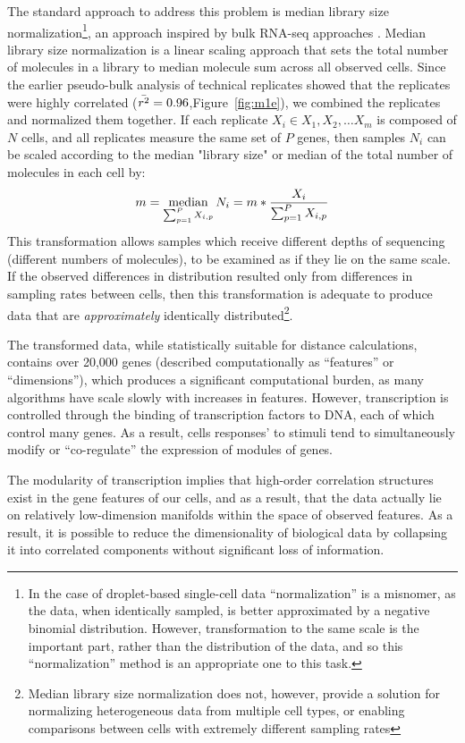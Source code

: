 The standard approach to address this problem is median library size normalization\footnote{In the case of droplet-based single-cell data ``normalization'' is a misnomer, as the data, when identically sampled, is better approximated by a negative binomial distribution. However, transformation to the same scale is the important part, rather than the distribution of the data, and so this ``normalization'' method is an appropriate one to this task.}, an approach inspired by bulk RNA-seq approaches \citep{Robinson2010}.
Median library size normalization is a linear scaling approach that sets the total number of molecules in a library to median molecule sum across all observed cells. 
Since the earlier pseudo-bulk analysis of technical replicates showed that the replicates were highly correlated ($\bar{r^2} = 0.96$,Figure~\ref{fig:m1e}), we combined the replicates and normalized them together.  
If each replicate $X_i \in {X_1, X_2, \ldots X_m}$ is composed of $N$ cells, and all replicates measure the same set of $P$ genes, then samples $N_i$ can be scaled according to the median "library size" or median of the total number of molecules in each cell by: 
\[
  m = \operatorname*{median}_{\sum_{p=1}^{P}{X_{i,p}}}
  N_i = m * \frac{X_i}{\sum_{p=1}^{P}{X_{i,p}}}
\]
This transformation allows samples which receive different depths of sequencing (different numbers of molecules), to be examined as if they lie on the same scale.
If the observed differences in distribution resulted only from differences in sampling rates between cells, then this transformation is adequate to produce data that are \textit{approximately} identically distributed\footnote{Median library size normalization does not, however, provide a solution for normalizing heterogeneous data from multiple cell types, or enabling comparisons between cells with extremely different sampling rates\citep{Anders2010}}. %

The transformed data, while statistically suitable for distance calculations, contains over 20,000 genes (described computationally as ``features'' or ``dimensions''), which produces a significant computational burden, as many algorithms have scale slowly with increases in features.
However, transcription is controlled through the binding of transcription factors to DNA, each of which control many genes. %
As a result, cells responses' to stimuli tend to simultaneously modify or ``co-regulate'' the expression of modules of genes. 

The modularity of transcription implies that high-order correlation structures exist in the gene features of our cells, and as a result, that the data actually lie on relatively low-dimension manifolds within the space of observed features. %
As a result, it is possible to reduce the dimensionality of biological data by collapsing it into correlated components without significant loss of information. %

